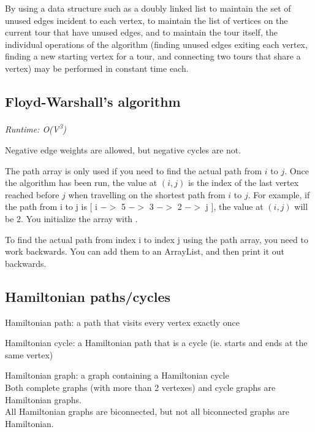 By using a data structure such as a doubly linked list to maintain the set of unused edges incident to each vertex, to maintain the list of vertices on the current tour that have unused edges, and to maintain the tour itself, the individual operations of the algorithm (finding unused edges exiting each vertex, finding a new starting vertex for a tour, and connecting two tours that share a vertex) may be performed in constant time each.

\subsection*{Floyd-Warshall's algorithm}

\textit{Runtime: O(V\textsuperscript{3})}

Negative edge weights are allowed, but negative cycles are not.

The path array is only used if you need to find the actual path from $i$ to $j$. Once the algorithm has been run, the value at $(i, j)$ is the index of the last vertex reached before $j$ when travelling on the shortest path from $i$ to $j$. For example, if the path from i to j is [ i $->$ 5 $->$ 3 $->$ 2 $->$ j ], the value at $(i, j)$ will be 2. You initialize the array with .



To find the actual path from index i to index j using the path array, you need to work backwards. You can add them to an ArrayList, and then print it out backwards.



\subsection*{Hamiltonian paths/cycles} 

Hamiltonian path: a path that visits every vertex exactly once

Hamiltonian cycle: a Hamiltonian path that is a cycle (ie. starts and ends at the same vertex)

Hamiltonian graph: a graph containing a Hamiltonian cycle \\
\indent Both complete graphs (with more than 2 vertexes) and cycle graphs are Hamiltonian graphs. \\
\indent All Hamiltonian graphs are biconnected, but not all biconnected graphs are Hamiltonian.

